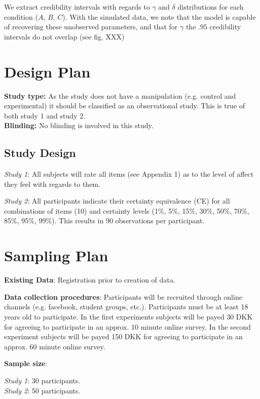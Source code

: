 \documentclass[12pt]{article}
\begin{document}
We extract credibility intervals with regards
to $\gamma$ and $\delta$ distributions for each
condition ($A$, $B$, $C$). With the simulated
data, we note that the model is capable of
recovering these unobserved parameters, and
that for $\gamma$ the  $.95$ credibility
intervals do not overlap (see fig. XXX)



 \section{Design Plan}

\textbf{Study type:} As the study does not have
a manipulation (e.g. control and experimental)
it should be classified as an observational study.
This is true of both study 1 and study 2. \\

\textbf{Blinding:} No blinding is involved in this study. \\

\subsection{Study Design}

\emph{Study 1}: All subjects will rate all items
(see Appendix 1) as to the level of affect they
feel with regards to them.

\emph{Study 2}: All participants
indicate their certainty equivalence (CE) for all
combinations of items (10) and certainty levels
(1\%, 5\%, 15\%, 30\%, 50\%, 70\%, 85\%, 95\%, 99\%).
This results in $90$ observations per participant.

\section{Sampling Plan}

\textbf{Existing Data}: Registration prior
to creation of data.

\textbf{Data collection procedures}:
Participants will be recruited through online
channels (e.g. facebook, student groups, etc.).
Participants must be at least 18 years old to
participate. In the first experiments subjects
will be payed 30 DKK for agreeing to participate
in an approx. 10 minute online survey. In the
second experiment subjects will be payed 150 DKK
for agreeing to participate in an approx. 60 minute
online survey.

\textbf{Sample size}:

\emph{Study 1}: 30 participants. \\
\emph{Study 2}: 50 participants.
\end{document}

